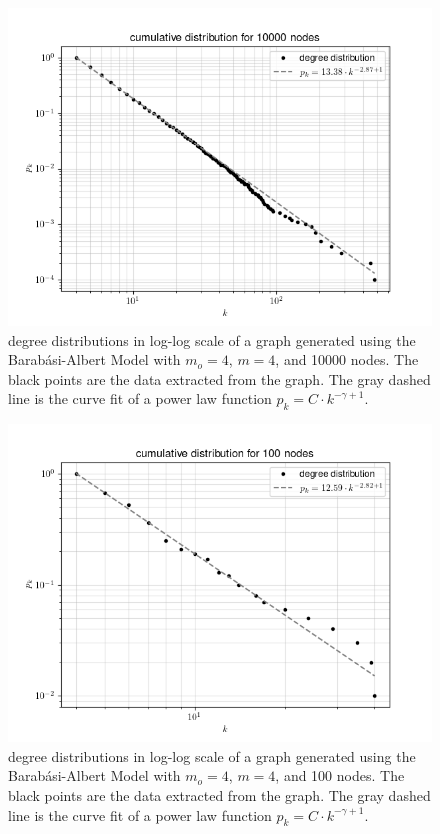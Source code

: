 \documentclass{article}
\newcommand{\scaleFreeFunction}{\ensuremath{p_k = C \cdot k^{-\gamma + 1}}}
\newcommand{\netDescription}[1]{degree distributions in log-log scale of a graph generated using the Barabási-Albert Model with $m_o = 4$, $m = 4$, and #1 nodes. The black points are the data extracted from the graph. The gray dashed line is the curve fit of a power law function \scaleFreeFunction.}
\begin{document}
\begin{figure}[!ht]
    \centering
    \includegraphics[width=\textwidth]{../result/all_degrees/10000.png}
    \caption{\netDescription{10000}}
    \label{figure:all-10000}
\end{figure}

\begin{figure}[!ht]
    \centering
    \includegraphics[width=\textwidth]{../result/all_degrees/100.png}
    \caption{\netDescription{100}}
    \label{figure:large-100}
\end{figure}
\end{document}

